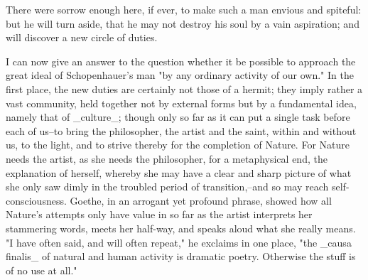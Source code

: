 There were sorrow enough here, if ever, to make such a man envious
and spiteful: but he will turn aside, that he may not destroy his
soul by a vain aspiration; and will discover a new circle of duties.

I can now give an answer to the question whether it be possible to
approach the great ideal of Schopenhauer's man "by any ordinary
activity of our own." In the first place, the new duties are
certainly not those of a hermit; they imply rather a vast community,
held together not by external forms but by a fundamental idea, namely
that of _culture_; though only so far as it can put a single task
before each of us--to bring the philosopher, the artist and the
saint, within and without us, to the light, and to strive thereby for
the completion of Nature. For Nature needs the artist, as she needs
the philosopher, for a metaphysical end, the explanation of herself,
whereby she may have a clear and sharp picture of what she only saw
dimly in the troubled period of transition,--and so may reach
self-consciousness. Goethe, in an arrogant yet profound phrase,
showed how all Nature's attempts only have value in so far as the
artist interprets her stammering words, meets her half-way, and
speaks aloud what she really means. "I have often said, and will
often repeat," he exclaims in one place, "the _causa finalis_ of
natural and human activity is dramatic poetry. Otherwise the stuff is
of no use at all."


